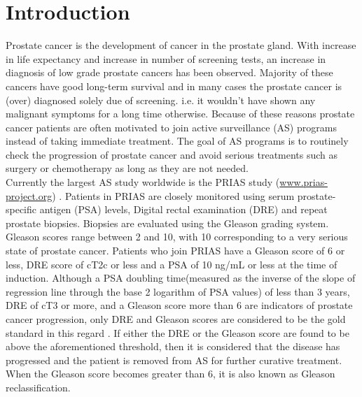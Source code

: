 
\section{Introduction}
\label{sec : introduction}
Prostate cancer is the development of cancer in the prostate gland. With increase in life expectancy and increase in number of screening tests, an increase in diagnosis of low grade prostate cancers has been observed. Majority of these cancers have good long-term survival and in many cases the prostate cancer is (over) diagnosed solely due of screening. i.e. it wouldn't have shown any malignant symptoms for a long time otherwise. Because of these reasons prostate cancer patients are often motivated to join active surveillance (AS) programs instead of taking immediate treatment. The goal of AS programs is to routinely check the progression of prostate cancer and avoid serious treatments such as surgery or chemotherapy as long as they are not needed.\\

Currently the largest AS study worldwide is the PRIAS study (\url{www.prias-project.org}) \citep{bokhorst2015compliance}. Patients in PRIAS are closely monitored using serum prostate-specific antigen (PSA) levels, Digital rectal examination (DRE) and repeat prostate biopsies. Biopsies are evaluated using the Gleason grading system. Gleason scores range between 2 and 10, with 10 corresponding to a very serious state of prostate cancer. Patients who join PRIAS have a Gleason score of 6 or less, DRE score of cT2c or less and a PSA of 10 ng/mL or less at the time of induction. Although a PSA doubling time(measured as the inverse of the slope of regression line through the base 2 logarithm of PSA values) of less than 3 years, DRE of cT3 or more, and a Gleason score more than 6 are indicators of prostate cancer progression, only DRE and Gleason scores are considered to be the gold standard in this regard \citep{bokhorst2016decade}. If either the DRE or the Gleason score are found to be above the aforementioned threshold, then it is considered that the disease has progressed and the patient is removed from AS for further curative treatment. When the Gleason score becomes greater than 6, it is also known as Gleason reclassification.\\

